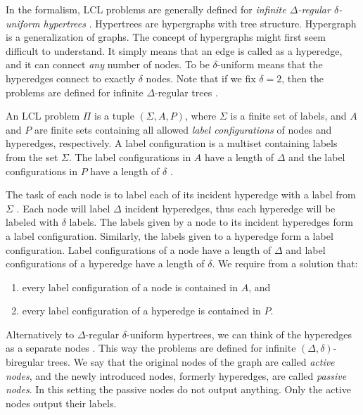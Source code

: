 In the formalism, LCL problems are generally defined for \emph{infinite $\Delta$-regular $\delta$-uniform hypertrees} \cite{DBLP:conf/podc/Olivetti20}.
Hypertrees are hypergraphs with tree structure.
Hypergraph is a generalization of graphs.
The concept of hypergraphs might first seem difficult to understand.
It simply means that an edge is called as a hyperedge, and it can connect \emph{any} number of nodes.
To be $\delta$-uniform means that the hyperedges connect to exactly $\delta$ nodes.
Note that if we fix $\delta=2$, then the problems are defined for infinite $\Delta$-regular trees \cite{DBLP:conf/podc/Olivetti20}.

An LCL problem $\Pi$ is a tuple $(\Sigma, A, P)$, where $\Sigma$ is a finite set of labels, and $A$ and $P$ are finite sets containing all allowed \emph{label configurations} of nodes and hyperedges, respectively.
A label configuration is a multiset containing labels from the set $\Sigma$.
The label configurations in $A$ have a length of $\Delta$ and the label configurations in $P$ have a length of $\delta$ \cite{DBLP:journals/sigact/Suomela20}.

The task of each node is to label each of its incident hyperedge with a label from $\Sigma$ \cite{DBLP:journals/sigact/Suomela20}.
Each node will label $\Delta$ incident hyperedges, thus each hyperedge will be labeled with $\delta$ labels.
The labels given by a node to its incident hyperedges form a label configuration.
Similarly, the labels given to a hyperedge form a label configuration.
Label configurations of a node have a length of $\Delta$ and label configurations of a hyperedge have a length of $\delta$.
We require from a solution that:
\begin{enumerate}
  \item every label configuration of a node is contained in $A$, and
  \item every label configuration of a hyperedge is contained in $P$.
\end{enumerate}

Alternatively to $\Delta$-regular $\delta$-uniform hypertrees, we can think of the hyperedges as a separate nodes \cite{DBLP:conf/podc/Olivetti20}.
This way the problems are defined for infinite $(\Delta, \delta)$-biregular trees.
We say that the original nodes of the graph are called \emph{active nodes}, and the newly introduced nodes, formerly hyperedges, are called \emph{passive nodes}.
In this setting the passive nodes do not output anything.
Only the active nodes output their labels.

